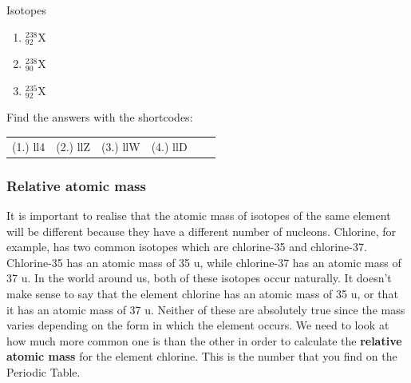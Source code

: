 \begin{exercises}  {Isotopes }
\begin{enumerate}[noitemsep, label=\textbf{\arabic*}. ]
\label{m38753*id258452}\begin{enumerate}[noitemsep, label=\textbf{\alph*}. ] 
            \label{m38753*uid65}\item $_{92}^{238}\mathrm{X}$
\label{m38753*uid66}\item $_{90}^{238}\mathrm{X}$
\label{m38753*uid67}\item $_{92}^{235}\mathrm{X}$
\end{enumerate}
                \end{enumerate}
      \label{m38753*uid68}
\par {} Find the answers with the shortcodes:
 \par \begin{tabular}[h]{cccccc}
 (1.) ll4  &  (2.) llZ  &  (3.) llW  &  (4.) llD  & \end{tabular}

\end{exercises}

            \subsubsection{ Relative atomic mass}
            \nopagebreak
            \label{m38753*id258557}It is important to realise that the atomic mass of isotopes of the same element will be different because they have a different number of nucleons. Chlorine, for example, has two common isotopes which are chlorine-35 and chlorine-37. Chlorine-35 has an atomic mass of 35 u, while chlorine-37 has an atomic mass of 37 u. In the world around us, both of these isotopes occur naturally. It doesn't make sense to say that the element chlorine has an atomic mass of 35 u, or that it has an atomic mass of 37 u. Neither of these are absolutely true since the mass varies depending on the form in which the element occurs. We need to look at how much more common one is than the other in order to calculate the \textbf{relative atomic mass} for the element chlorine. This is the number that you find on the Periodic Table.\par 

      

